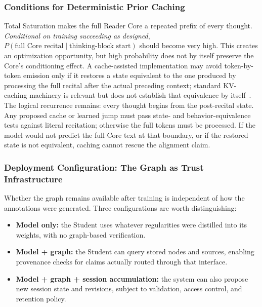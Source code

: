 \documentclass[11pt]{article}
\begin{document}
\subsubsection{Conditions for Deterministic Prior Caching}
\label{sec:identity-caching}

Total Saturation makes the full Reader Core a repeated prefix of every thought.
\emph{Conditional on training succeeding as designed},
$P(\text{full Core recital} \mid \text{thinking-block start})$ should become very high. This
creates an optimization opportunity, but high probability does not by itself
preserve the Core's conditioning effect. A cache-assisted implementation may
avoid token-by-token emission only if it restores a state equivalent to the one
produced by processing the full recital after the actual preceding context;
standard KV-caching machinery is relevant but does not establish that
equivalence by itself~\cite{kwon2023efficient}. The logical recurrence remains:
every thought begins from the post-recital state. Any proposed cache or learned
jump must pass state- and behavior-equivalence tests against literal recitation;
otherwise the full tokens must be processed. If the model would not predict the
full Core text at that boundary, or if the restored state is not equivalent,
caching cannot rescue the alignment claim.

\subsubsection{Deployment Configuration: The Graph as Trust Infrastructure}
\label{sec:deployment-config}

Whether the graph remains available after training is independent of how the
annotations were generated. Three configurations are worth distinguishing:

\begin{itemize}[leftmargin=*]
    \item \textbf{Model only:} the Student uses whatever regularities were
    distilled into its weights, with no graph-based verification.
    \item \textbf{Model + graph:} the Student can query stored nodes and
    sources, enabling provenance checks for claims actually routed through that
    interface.
    \item \textbf{Model + graph + session accumulation:} the system can also
    propose new session state and revisions, subject to validation, access
    control, and retention policy.
\end{itemize}
\end{document}
